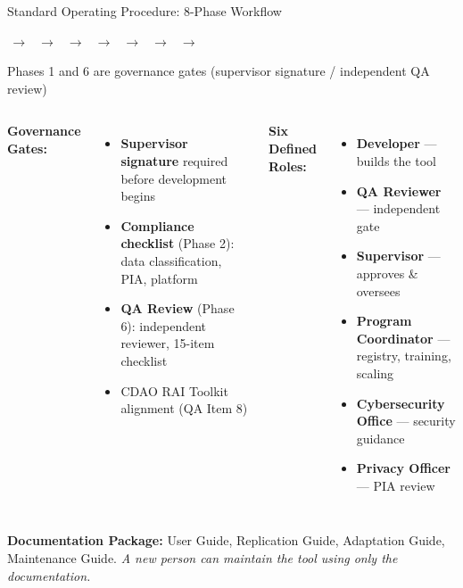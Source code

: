 \documentclass[aspectratio=169,11pt]{beamer}
\newcommand{\hl}[1]{\textbf{\color{scarlet}#1}}
\newcommand{\navy}[1]{\textbf{\color{navyblue}#1}}
\begin{document}
\begin{frame}[shrink=5]{Standard Operating Procedure: 8-Phase Workflow}

\begin{center}
{\tiny\bfseries
{}%
\,$\to$\,%
%
\,$\to$\,%
%
\,$\to$\,%
%
\,$\to$\,%
%
\,$\to$\,%
%
\,$\to$\,%
%
\,$\to$\,%
%
}
\end{center}
{\centering\scriptsize\color{scarlet} Phases 1 and 6 are governance gates (supervisor signature / independent QA review)\par}

\vspace{2pt}

\begin{columns}[T]

\navy{Governance Gates:}
\begin{itemize}\small
  \item \hl{Supervisor signature} required before development begins
  \item \hl{Compliance checklist} (Phase 2): data classification, PIA, platform
  \item \hl{QA Review} (Phase 6): independent reviewer, 15-item checklist
  \item CDAO RAI Toolkit alignment (QA Item 8)
\end{itemize}


\navy{Six Defined Roles:}
\begin{itemize}\small
  \item \textbf{Developer} --- builds the tool
  \item \textbf{QA Reviewer} --- independent gate
  \item \textbf{Supervisor} --- approves \& oversees
  \item \textbf{Program Coordinator} --- registry, training, scaling
  \item \textbf{Cybersecurity Office} --- security guidance
  \item \textbf{Privacy Officer} --- PIA review
\end{itemize}

\end{columns}

\vspace{4pt}
{\small\navy{Documentation Package:} User Guide, Replication Guide, Adaptation Guide, Maintenance Guide. \emph{A new person can maintain the tool using only the documentation.}}

\end{frame}
\end{document}
